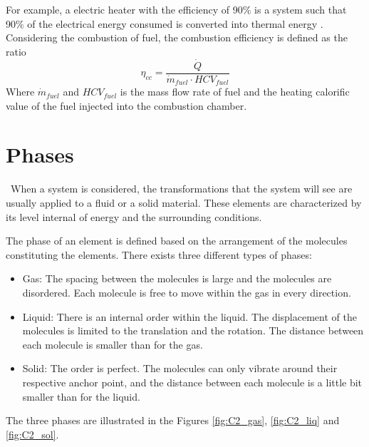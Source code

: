 For example, a electric heater with the efficiency of 90\% is a system such that 90\% of the electrical energy consumed is converted into thermal energy .  
Considering the combustion of fuel, the combustion efficiency is defined as the ratio
$$ \eta_{cc} = \frac{\dot{Q}}{\dot{m}_{fuel}\cdot HCV_{fuel}}$$
Where $\dot{m}_{fuel}$  and $HCV_{fuel}$ is the mass flow rate of fuel and the heating calorific value of the fuel injected into the combustion chamber.

\section{Phases}
\quad\ When a system is considered, the transformations that the system will see are usually applied to a fluid or a solid material. These elements are characterized by its level internal of energy and the surrounding conditions.

The phase of an element is defined based on the arrangement of the molecules constituting the elements. There exists three different types of phases:

\begin{itemize}
    \item Gas: The spacing between the molecules is large and the molecules are disordered. Each molecule is free to move within the gas in every direction.
    \item Liquid: There is an internal order within the liquid. The displacement of the molecules is limited to the translation and the rotation. The distance between each molecule is smaller than for the gas.
    \item Solid: The order is perfect. The molecules can only vibrate around their respective anchor point, and the distance between each molecule is a little bit smaller than for the liquid.
\end{itemize}

The three phases are illustrated in the Figures \ref{fig:C2_gas}, \ref{fig:C2_liq} and  \ref{fig:C2_sol}.

